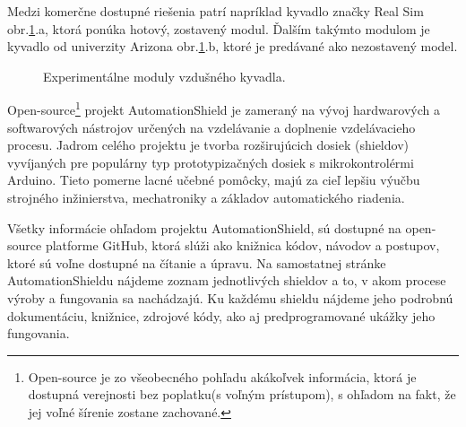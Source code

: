 Medzi komerčne dostupné riešenia patrí napríklad kyvadlo značky Real Sim obr.\ref{OBRAZOK 1.2}.a, ktorá ponúka hotový, zostavený modul. Ďalším takýmto modulom je kyvadlo od univerzity Arizona\cite{enikov_campa_2012} obr.\ref{OBRAZOK 1.2}.b, ktoré je predávané ako nezostavený model. 

\begin{figure}[!tbh]
	\hfill
	\hfill
	\hfill
	\caption{Experimentálne moduly vzdušného kyvadla.}\label{OBRAZOK 1.2}
\end{figure}

\newpage
Open-source\footnote[1]{Open-source je zo všeobecného pohľadu akákoľvek informácia, ktorá je dostupná verejnosti bez poplatku(s voľným prístupom), s ohľadom na fakt, že jej voľné šírenie zostane zachované.} projekt AutomationShield je zameraný na vývoj hardwarových a softwarových nástrojov určených na vzdelávanie a doplnenie vzdelávacieho procesu. Jadrom celého projektu je tvorba rozširujúcich dosiek (shieldov) vyvíjaných pre populárny typ prototypizačných dosiek s mikrokontrolérmi Arduino. Tieto pomerne lacné učebné pomôcky, majú za cieľ lepšiu výučbu strojného inžinierstva, mechatroniky a základov automatického riadenia\cite{Auto}.

Všetky informácie ohľadom projektu AutomationShield, sú dostupné na open-source platforme GitHub\cite{Git}, ktorá slúži ako knižnica kódov, návodov a postupov, ktoré sú voľne dostupné na čítanie a úpravu. Na samostatnej stránke AutomationShieldu nájdeme zoznam jednotlivých shieldov a to, v akom procese výroby a fungovania sa nachádzajú. Ku každému shieldu nájdeme jeho podrobnú dokumentáciu, knižnice, zdrojové kódy, ako aj predprogramované ukážky jeho fungovania. 

